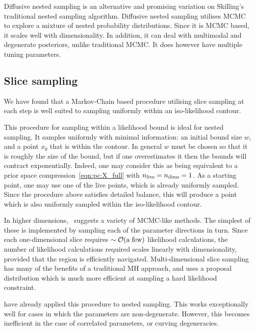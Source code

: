 Diffusive nested sampling \citep{DiffusiveNestedSampling} is an alternative and promising variation on Skilling's traditional nested sampling algorithm. Diffusive nested sampling utilises MCMC to explore a mixture of nested probability distributions. Since it is MCMC based, it scales well with dimensionality. In addition, it can deal with multimodal and degenerate posteriors, unlike traditional MCMC\@. It does however have multiple tuning parameters.


\subsection{Slice sampling}
\label{sec:bay:slice_sampling}
We have found that a Markov-Chain based procedure utilising slice sampling \citep{NealSlice} at each step is well suited to sampling uniformly within an iso-likelihood contour.

This procedure for sampling within a likelihood bound is ideal for nested sampling. It samples uniformly with minimal information: an initial bound size \(w\), and a point \(x_0\) that is within the contour. In general \(w\) must be chosen so that it is roughly the size of the bound, but if one overestimates it then the bounds will contract exponentially. Indeed, one may consider this as being equivalent to a prior space compression~\eqref{eqn:pc:X_full} with \(n_{\mathrm{live}}=n_{\mathrm{dims}}=1\). As a starting point, one may use one of the live points, which is already uniformly sampled. Since the procedure above satisfies detailed balance, this will produce a point which is also uniformly sampled within the iso-likelihood contour.

In higher dimensions,~\cite{NealSlice} suggests a variety of MCMC-like methods. The simplest of these is implemented by sampling each of the parameter directions in turn. Since each one-dimensional slice requires \({\sim\mathcal{O}{\left(\text{a few}\right)}}\) likelihood calculations, the number of likelihood calculations required scales linearly with dimensionality, provided that the region is efficiently navigated. Multi-dimensional slice sampling has many of the benefits of a traditional MH approach, and uses a proposal distribution which is much more efficient at sampling a hard likelihood constraint.

\cite{SystemsBio} have already applied this procedure to nested sampling. This works exceptionally well for cases in which the parameters are non-degenerate. However, this becomes inefficient in the case of correlated parameters, or curving degeneracies.





